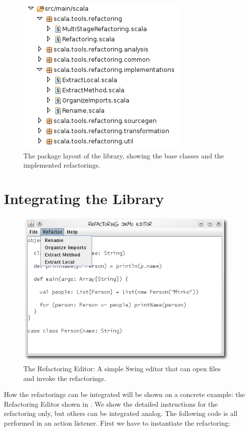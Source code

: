 \documentclass[10pt,a4paper,oneside]{scrreprt}
\begin{document}
\begin{figure}
  \centering
  \includegraphics[width=0.5\linewidth]{package-layout.png}
  \caption{The package layout of the library, showing the base classes and the implemented refactorings.}
  \label{figure:package-layout}
\end{figure}

\section{Integrating the Library}

\begin{figure}
  \centering
  \includegraphics[width=0.7\linewidth]{refactoring-editor.png}
  \caption{The Refactoring Editor: A simple Swing editor that can open files and invoke the refactorings.}
  \label{figure:refactoring-editor}
\end{figure}

How the refactorings can be integrated will be shown on a concrete example: the Refactoring Editor shown in . We show the detailed instructions for the  refactoring only, but others can be integrated analog. The following code is all performed in an action listener. First we have to instantiate the refactoring:
\end{document}
